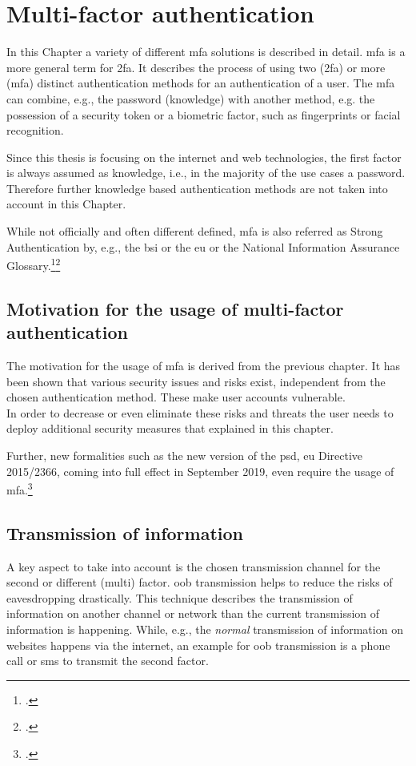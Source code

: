 \chapter{Multi-factor authentication}

In this Chapter a variety of different \gls{mfa} solutions is described in detail. \Gls{mfa} is a more general term for \gls{2fa}. It describes the process of using two (\gls{2fa}) or more (\gls{mfa}) distinct authentication methods for an authentication of a user. The \gls{mfa} can combine, e.g., the password (knowledge) with another method, e.g. the possession of a security token or a biometric factor, such as fingerprints or facial recognition.

Since this thesis is focusing on the internet and web technologies, the first factor is always assumed as knowledge, i.e., in the majority of the use cases a password. Therefore further knowledge based authentication methods are not taken into account in this Chapter.

While not officially and often different defined, \gls{mfa} is also referred as Strong Authentication by, e.g., the \gls{bsi} or the \gls{eu} or the National Information Assurance Glossary.\footcites[See][47]{CNSS4009}\footcites[See][11]{deutschland2018grundschutz}

\section{Motivation for the usage of multi-factor authentication}

The motivation for the usage of \gls{mfa} is derived from the previous chapter. It has been shown that various security issues and risks exist, independent from the chosen authentication method. These make user accounts vulnerable.\\
 In order to decrease or even eliminate these risks and threats the user needs to deploy additional security measures that explained in this chapter.
 
 Further, new formalities such as the new version of the \gls{psd}, \gls{eu} Directive 2015/2366, coming into full effect in September 2019, even require the usage of \gls{mfa}.\footcites[See][10]{NOCTOR20189}

\newpage

\section{Transmission of information}

A key aspect to take into account is the chosen transmission channel for the second or different (multi) factor. \gls{oob} transmission helps to reduce the risks of eavesdropping drastically. This technique describes the transmission of information on another channel or network than the current transmission of information is happening. While, e.g., the \textit{normal} transmission of information on websites happens via the internet, an example for \gls{oob} transmission is a phone call or \gls{sms} to transmit the second factor. 